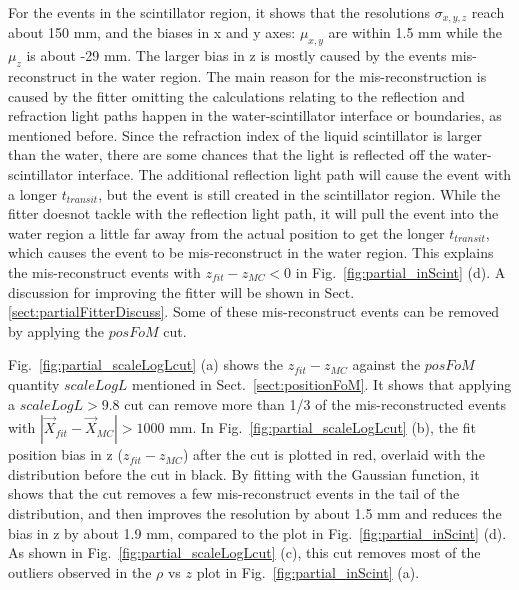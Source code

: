 For the events in the scintillator region, it shows that the resolutions $\sigma_{x,y,z}$ reach about 150 mm, and the biases in x and y axes: $\mu_{x,y}$ are within 1.5 mm while the $\mu_z$ is about -29 mm. The larger bias in z is mostly caused by the events mis-reconstruct in the water region. The main reason for the mis-reconstruction is caused by the fitter omitting the calculations relating to the reflection and refraction light paths happen in the water-scintillator interface or boundaries, as mentioned before. Since the refraction index of the liquid scintillator is larger than the water, there are some chances that the light is reflected off the water-scintillator interface. The additional reflection light path will cause the event with a longer $t_{transit}$, but the event is still created in the scintillator region. While the fitter doesnot tackle with the reflection light path, it will pull the event into the water region a little far away from the actual position to get the longer $t_{transit}$, which causes the event to be mis-reconstruct in the water region. This explains the mis-reconstruct events with $z_{fit}-z_{MC}<0$ in Fig.~\ref{fig:partial_inScint} (d). A discussion for improving the fitter will be shown in Sect.\ref{sect:partialFitterDiscuss}. Some of these mis-reconstruct events can be removed by applying the $posFoM$ cut. 

Fig.~\ref{fig:partial_scaleLogLcut} (a) shows the $z_{fit}-z_{MC}$ against the $posFoM$ quantity $scaleLogL$ mentioned in Sect.~\ref{sect:positionFoM}. It shows that applying a $scaleLogL>9.8$ cut can remove more than 1/3 of the mis-reconstructed events with $|\vec{X}_{fit}-\vec{X}_{MC}|>1000$ mm. In Fig.~\ref{fig:partial_scaleLogLcut} (b), the fit position bias in z ($z_{fit}-z_{MC}$) after the cut is plotted in red, overlaid with the distribution before the cut in black. By fitting with the Gaussian function, it shows that the cut removes a few mis-reconstruct events in the tail of the distribution, and then improves the resolution by about 1.5 mm and reduces the bias in z by about 1.9 mm, compared to the plot in Fig.~\ref{fig:partial_inScint} (d). As shown in Fig.~\ref{fig:partial_scaleLogLcut} (c), this cut removes most of the outliers observed in the $\rho$ vs $z$ plot in Fig.~\ref{fig:partial_inScint} (a).


